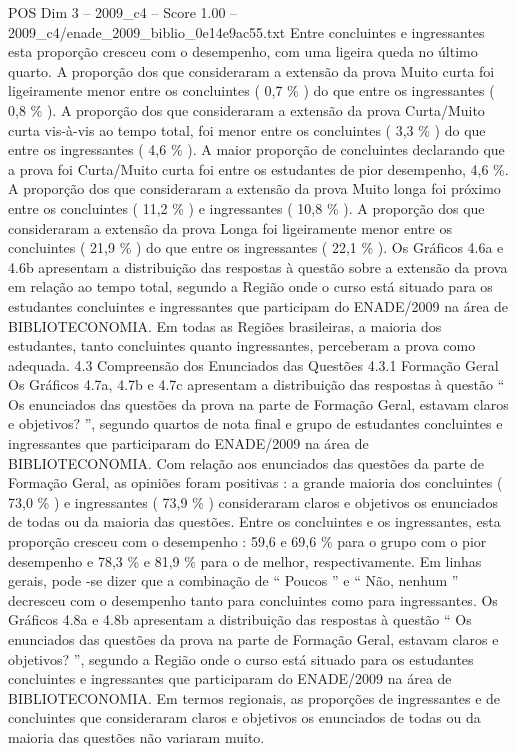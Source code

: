 \begin{textsample}{POS Dim 3 – 2009\_c4 – Score 1.00 – 2009\_c4/enade\_2009\_biblio\_0e14e9ac55.txt}
Entre concluintes e ingressantes esta proporção cresceu com o desempenho, com uma ligeira queda no último quarto.
A proporção dos que consideraram a extensão da prova Muito curta foi ligeiramente menor entre os concluintes ( 0,7 \% ) do que entre os ingressantes ( 0,8 \% ).
A proporção dos que consideraram a extensão da prova Curta/Muito curta vis-à-vis ao tempo total, foi menor entre os concluintes ( 3,3 \% ) do que entre os ingressantes ( 4,6 \% ).
A maior proporção de concluintes declarando que a prova foi Curta/Muito curta foi entre os estudantes de pior desempenho, 4,6 \%.
A proporção dos que consideraram a extensão da prova Muito longa foi próximo entre os concluintes ( 11,2 \% ) e ingressantes ( 10,8 \% ).
A proporção dos que consideraram a extensão da prova Longa foi ligeiramente menor entre os concluintes ( 21,9 \% ) do que entre os ingressantes ( 22,1 \% ).
Os Gráficos 4.6a e 4.6b apresentam a distribuição das respostas à questão sobre a extensão da prova em relação ao tempo total, segundo a Região onde o curso está situado para os estudantes concluintes e ingressantes que participam do ENADE/2009 na área de BIBLIOTECONOMIA.
Em todas as Regiões brasileiras, a maioria dos estudantes, tanto concluintes quanto ingressantes, perceberam a prova como adequada. 4.3 Compreensão dos Enunciados das Questões 4.3.1 Formação Geral Os Gráficos 4.7a, 4.7b e 4.7c apresentam a distribuição das respostas à questão “ Os enunciados das questões da prova na parte de Formação Geral, estavam claros e objetivos? ”, segundo quartos de nota final e grupo de estudantes concluintes e ingressantes que participaram do ENADE/2009 na área de BIBLIOTECONOMIA.
Com relação aos enunciados das questões da parte de Formação Geral, as opiniões foram positivas : a grande maioria dos concluintes ( 73,0 \% ) e ingressantes ( 73,9 \% ) consideraram claros e objetivos os enunciados de todas ou da maioria das questões.
Entre os concluintes e os ingressantes, esta proporção cresceu com o desempenho : 59,6 e 69,6 \% para o grupo com o pior desempenho e 78,3 \% e 81,9 \% para o de melhor, respectivamente.
Em linhas gerais, pode -se dizer que a combinação de “ Poucos ” e “ Não, nenhum ” decresceu com o desempenho tanto para concluintes como para ingressantes.
Os Gráficos 4.8a e 4.8b apresentam a distribuição das respostas à questão “ Os enunciados das questões da prova na parte de Formação Geral, estavam claros e objetivos? ”, segundo a Região onde o curso está situado para os estudantes concluintes e ingressantes que participaram do ENADE/2009 na área de BIBLIOTECONOMIA.
Em termos regionais, as proporções de ingressantes e de concluintes que consideraram claros e objetivos os enunciados de todas ou da maioria das questões não variaram muito.

\end{textsample}
